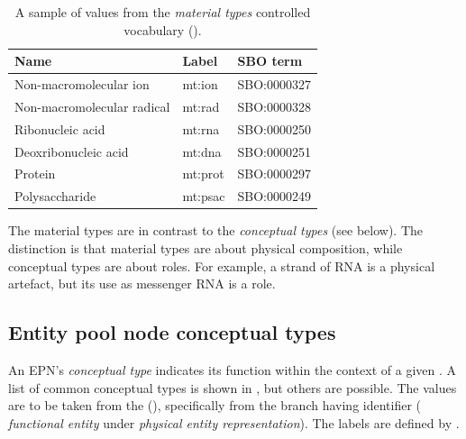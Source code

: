 \begin{table}[htb]
  \centering
  \begin{tabular}{l>{\ttfamily}l>{\ttfamily}l}
    \toprule
    \textbf{Name}              & \textbf{\rmfamily Label} & \textbf{\rmfamily SBO term} \\
    \midrule
    Non-macromolecular ion     & mt:ion  & SBO:0000327\\
    Non-macromolecular radical & mt:rad  & SBO:0000328\\
    Ribonucleic acid           & mt:rna  & SBO:0000250\\
    Deoxribonucleic acid       & mt:dna  & SBO:0000251\\
    Protein                    & mt:prot & SBO:0000297\\
    Polysaccharide             & mt:psac & SBO:0000249\\
    \bottomrule
  \end{tabular}
  \caption{A sample of values from the \emph{material types} controlled
    vocabulary ().}
  \label{tab:techref:material-types-cv}
\end{table}

The material types are in contrast to the \emph{conceptual types} (see
below).  The distinction is that material types are about physical
composition, while conceptual types are about roles.  For example, a
strand of RNA is a physical artefact, but its use as messenger RNA is
a role.


\subsection{Entity pool node conceptual types}
\label{sec:techref:conceptual-types-cv}

An EPN's \emph{conceptual type} indicates its function within the
context of a given \PD.  A list of common conceptual types is shown in
, but others are possible.  The values are to
be taken from the \sbo (\sbourl), specifically from the branch having
identifier  ($\!$\emph{functional entity} under
\emph{physical entity representation}).  The labels are defined by \SBGNPDLone.

